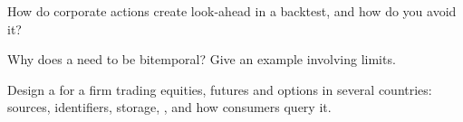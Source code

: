 \begin{interviewq}\label{iq:pl:reference-data-and-symbology-services:3}
How do corporate actions create look-ahead in a backtest, and how do you avoid it?
\end{interviewq}

\begin{interviewq}\label{iq:pl:reference-data-and-symbology-services:4}
Why does a  need to be bitemporal? Give an example involving limits.
\end{interviewq}

\begin{interviewq}\label{iq:pl:reference-data-and-symbology-services:5}
Design a  for a firm trading equities, futures and options in several countries: sources, identifiers,
storage, , and how consumers query it.
\end{interviewq}
